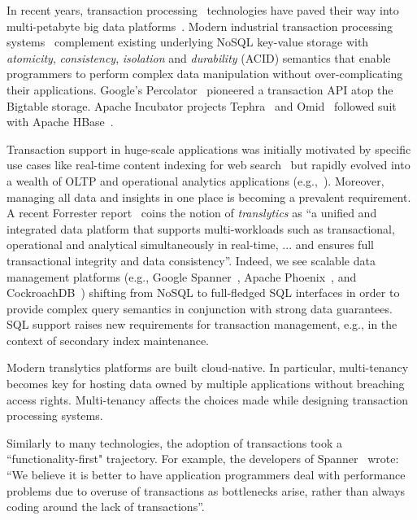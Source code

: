 In recent years, transaction processing~\cite{Gray:1992:TPC:573304} technologies have paved their way into multi-petabyte big data 
platforms~\cite{Percolator2010,Spanner2012,Omid2017}. 
Modern industrial transaction processing systems~\cite{Percolator2010, Omid2017, tephra, cockroach} complement 
existing underlying NoSQL key-value storage with {\em atomicity}, {\em consistency}, {\em isolation\/} and {\em durability} (ACID) 
semantics that enable programmers to perform complex data manipulation without over-complicating their applications. 
Google's Percolator~\cite{Percolator2010} pioneered a transaction API atop the Bigtable storage. Apache 
Incubator projects Tephra~\cite{tephra} and Omid~\cite{Omid2017} followed suit with Apache HBase~\cite{hbase}. 

Transaction support in huge-scale applications was initially motivated by specific use cases like real-time content indexing for web search~\cite{Percolator2010, Omid2017} but  rapidly evolved into a wealth of OLTP and operational analytics 
applications (e.g.,~\cite{Borthakur:2011, F1-2013}). Moreover, managing all data and insights in one place is becoming a prevalent requirement. A recent Forrester report~\cite{Forrester2017} coins the notion of {\em translytics}  as ``a unified and integrated data platform that supports multi-workloads such as transactional, operational and analytical simultaneously in real-time, ... and ensures full transactional integrity and data consistency''. Indeed, we see scalable data management platforms (e.g., Google Spanner~\cite{Spanner2012}, Apache Phoenix~\cite{phoenix}, and CockroachDB~\cite{cockroach}) shifting from NoSQL to full-fledged SQL interfaces in order to provide complex query semantics in conjunction with strong data guarantees. SQL support raises new requirements for transaction management, e.g., in the context of secondary index maintenance. 

Modern translytics platforms are built cloud-native. In particular, multi-tenancy becomes key 
for hosting data owned by multiple applications without breaching access rights. Multi-tenancy 
affects the choices made while designing transaction processing systems. 

Similarly to many technologies, the adoption of transactions took a  ``functionality-first" trajectory. 
For example, the developers of Spanner~\cite{Spanner2012} wrote:
  ``We believe it
is better to have application programmers deal with performance problems due to overuse 
of transactions as bottlenecks arise, rather than always coding around the lack of transactions''. 


